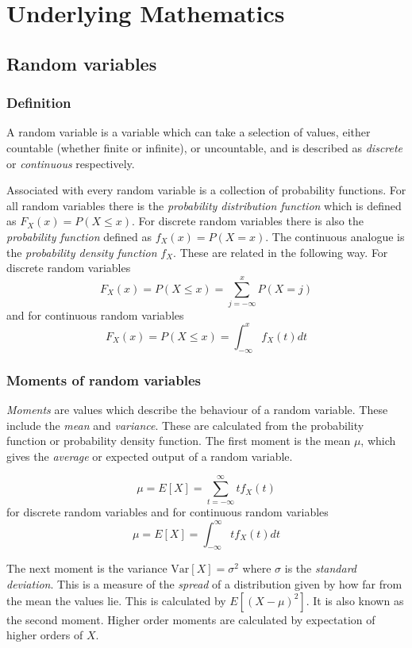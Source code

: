 \appendix

\chapter{Underlying Mathematics}
\label{maths}

\section{Random variables}

\subsection{Definition}

A random variable is a variable which can take a selection of values,
either countable (whether finite or infinite), or uncountable, and is
described as {\em discrete} or {\em continuous} respectively.

Associated with every random variable is a collection of probability
functions.  For all random variables there is the {\em probability
distribution function} which is defined as $F_X(x) = P(X \leq x)$.
For discrete random variables there is also the {\em probability
function} defined as $f_X(x) = P(X = x)$.  The continuous analogue is
the {\em probability density function} $f_X$.  These are related in
the following way.  For discrete random variables
\[ F_X(x) = P(X \leq x) = \sum_{j = - \infty}^{x}{P(X = j)} \]
and for continuous random variables
\[ F_X(x) = P(X \leq x) = \int_{ - \infty}^{x}{f_X(t) dt} \]

\subsection{Moments of random variables}
\label{append:moments}

{\em Moments} are values which describe the behaviour of a random
variable.  These include the {\em mean} and {\em variance}.  These are
calculated from the probability function or probability density
function.  The first moment is the mean $\mu$, which gives the {\em
average} or expected output of a random variable.

\[ \mu = E[X] = \sum_{t = -\infty}^{\infty}{t f_X(t)} \]
for discrete random variables and for continuous random variables
\[ \mu = E[X] = \int_{-\infty}^{\infty}{t f_X(t) dt} \]

The next moment is the variance $\mbox{Var}[X] = \sigma^2$ where
$\sigma$ is the {\em standard deviation}.  This is a measure of the
{\em spread} of a distribution given by how far from the mean the
values lie.  This is calculated by $E[(X-\mu)^2]$.  It is also known
as the second moment.  Higher order moments are calculated by
expectation of higher orders of $X$.

